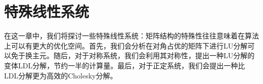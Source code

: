 \chapter{特殊线性系统}

在这一章中，我们将探讨一些特殊线性系统：矩阵结构的特殊性往往意味着在算法上可以有更大的优化空间。首先，我们会分析在对角占优的矩阵下进行LU分解可以免于换主元。随后，对于对称系统，我们会利用其对称性，提出一种LU分解的变体LDL分解，节约一半的计算量。最后，对于正定系统，我们会提出一种比LDL分解更为高效的Cholesky分解。





